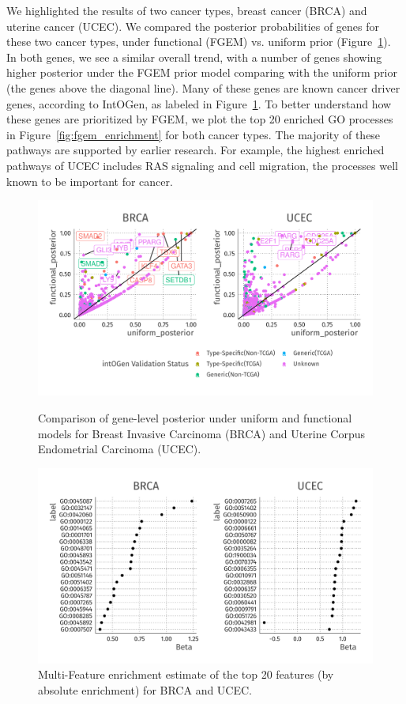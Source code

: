 We highlighted the results of two cancer types, breast cancer (BRCA) and uterine cancer (UCEC). We compared the posterior probabilities of genes for these two cancer types, under functional (FGEM) vs. uniform prior (Figure~\ref{fig:fgem_posterior}). In both genes, we see a similar overall trend, with a number of genes showing higher posterior under the FGEM prior model comparing with the uniform prior (the genes above the diagonal line). Many of these genes are known cancer driver genes, according to IntOGen, as labeled in Figure~\ref{fig:fgem_posterior}. To better understand how these genes are prioritized by FGEM, we plot the top 20 enriched GO processes in Figure~\ref{fig:fgem_enrichment} for both cancer types. The majority of these pathways are supported by earlier research. For example, the highest enriched pathways of UCEC includes RAS signaling and cell migration, the processes well known to be important for cancer. 

\begin{figure}
    \centering
    \includegraphics[width=.9\linewidth]{img/fgem_posterior_plot.png}\label{fig:fgem_posterior}
    \caption{Comparison of gene-level posterior under uniform and functional models for  Breast Invasive Carcinoma (BRCA) and Uterine Corpus Endometrial Carcinoma (UCEC).}
\end{figure}

\begin{figure}
    \centering
    \includegraphics[width=.9\linewidth]{img/fgem_enrichment_plot.png}
    \caption{Multi-Feature enrichment estimate of the top 20 features (by absolute enrichment) for BRCA and UCEC.} 
\end{figure}

